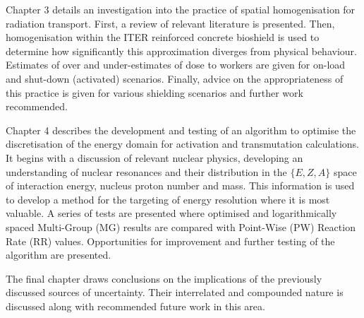 Chapter 3 details an investigation into the practice of spatial homogenisation for radiation transport. First, a review of relevant literature is presented. Then, homogenisation within the ITER reinforced concrete bioshield is used to determine how significantly this approximation diverges from physical behaviour. Estimates of over and under-estimates of dose to workers are given for on-load and shut-down (activated) scenarios. Finally, advice on the appropriateness of this practice is given for various shielding scenarios and further work recommended.

Chapter 4 describes the development and testing of an algorithm to optimise the discretisation of the energy domain for activation and transmutation calculations. It begins with a discussion of relevant nuclear physics, developing an understanding of nuclear resonances and their distribution in the $\{E, Z, A\}$ space of interaction energy, nucleus proton number and mass. This information is used to develop a method for the targeting of energy resolution where it is most valuable. A series of tests are presented where optimised and logarithmically spaced Multi-Group (MG)  results are compared with Point-Wise (PW)  Reaction Rate (RR)  values. Opportunities for improvement and further testing of the algorithm are presented.

The final chapter draws conclusions on the implications of the previously discussed sources of uncertainty. Their interrelated and compounded nature is discussed along with recommended future work in this area.

